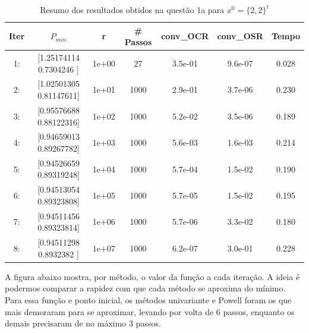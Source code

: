 \documentclass[10pt, a4paper]{article}
\begin{document}
\begin{table}[H]
  \begin{center}
    \begin{tabular}{c|c|c|c|c|c|c}
      \textbf{Iter} & \textbf{$P_{min}$} & \textbf{r} & \textbf{\# Passos} & \textbf{conv\_OCR} & \textbf{conv\_OSR} & \textbf{Tempo}\\
      \hline
        1:& [1.25174114 0.7304246 ]& 1e+00& 27& 3.5e-01& 9.6e-07& 0.028   \\
        2:& [1.02501305 0.81147611]& 1e+01& 1000& 2.9e-01& 3.7e-06& 0.230\\
        3:& [0.95576688 0.88122316]& 1e+02& 1000& 5.2e-02& 3.5e-06& 0.189\\
        4:& [0.94659013 0.89267782]& 1e+03& 1000& 5.6e-03& 1.6e-03& 0.214\\
        5:& [0.94526659 0.89319248]& 1e+04& 1000& 5.7e-04& 1.5e-02& 0.190\\
        6:& [0.94513054 0.89323808]& 1e+05& 1000& 5.7e-05& 1.5e-02& 0.195\\
        7:& [0.94511456 0.89323814]& 1e+06& 1000& 5.7e-06& 3.3e-02& 0.180\\
        8:& [0.94511298 0.8932382 ]& 1e+07& 1000& 6.2e-07& 3.0e-01& 0.228\\
    \end{tabular}
  \end{center}
  \caption{Resumo dos resultados obtidos na questão 1a para $x^0 = \{2,2\}^t$}
\end{table}


\vspace{3mm}
A figura abaixo mostra, por método, o valor da função a cada iteração. A ideia é podermos comparar 
a rapidez com que cada método se aproxima do mínimo. Para essa função e ponto inicial, os métodos univariante e Powell
foram os que mais demoraram para se aproximar, levando por volta de 6 passos, enquanto os demais precisaram de no máximo
3 passos.

\end{document}
